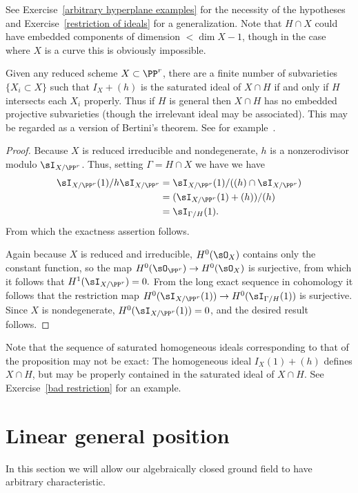 See Exercise~\ref{arbitrary hyperplane examples} for the necessity of the hypotheses
and Exercise~\ref{restriction of ideals} for a generalization. Note that
${H\cap X}$ could have embedded components of dimension $<\dim X -1$, though in the case where $X$ is a curve
this is obviously impossible. 

\begin{fact}
Given any reduced scheme $X\subset \PP^r$, there are a finite number of subvarieties $\{X_i\subset X\}$ such that
$I_X +(h)$ is the saturated ideal of $X\cap H$ if and only if $H$ intersects each $X_i$ properly. Thus if $H$ is general
then $X\cap H$ has no embedded projective subvarieties (though the irrelevant ideal may be associated). 
This may be regarded as a version of Bertini's theorem. See for example~\cite{WMACE}.
\end{fact}

\begin{proof}
Because $X$ is reduced irreducible and nondegenerate,
$h$ is a nonzerodivisor modulo $\sI_{X/\PP^r}$. Thus, setting $\Gamma = {H\cap X}$ we have
we have 
$$
\begin{aligned}
\sI_{X/\PP^r}(1)/h\sI_{X/\PP^r} &= \sI_{X/\PP^r}(1)/((h)\cap\sI_{X/\PP^r})\\
 &=(\sI_{X/\PP^r}(1)+(h))/(h)\\
 &= \sI_{\Gamma/H}(1).
\end{aligned}
 $$
 From which the exactness assertion follows.
 
 Again because $X$ is reduced and irreducible, $H^0(\sO_X)$ contains only the constant function, so the map $H^0(\sO_{\PP^r}) \to H^0(\sO_X)$ is surjective, 
from which it follows that $H^1(\sI_{X/\PP^r}) = 0.$ From the long exact sequence in cohomology it follows that
 the restriction map $H^0(\sI_{X/\PP^r}(1))\to H^0(\sI_{\Gamma/H}(1))$ is surjective. Since
$X$ is nondegenerate, $H^0(\sI_{X/\PP^r}(1)) = 0$, and the desired result follows.
\end{proof}

Note that the sequence of saturated homogeneous ideals corresponding to that of the proposition may not be exact: 
The homogeneous ideal $I_X(1)+(h)$
defines $X\cap H$, but may be properly contained in the saturated ideal of $X\cap H$. See Exercise~\ref{bad restriction} for an example. 


\section{Linear general position}
In this section we will allow our algebraically closed ground field to have arbitrary characteristic. 

